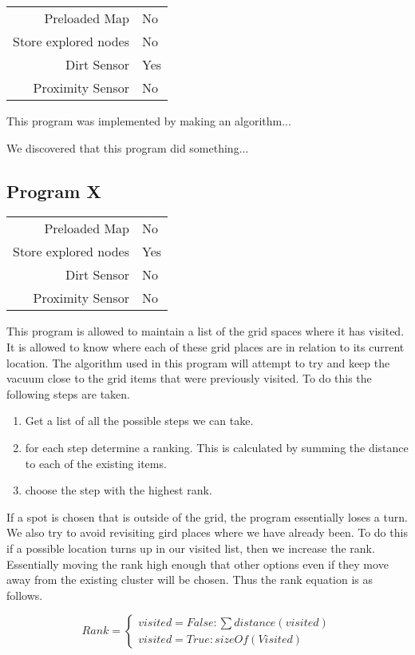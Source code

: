 \documentclass[letterpaper]{article}
\begin{document}
\begin{tabular}{ r | l }  
	Preloaded Map			& No \\
	Store explored nodes	& No \\
	Dirt Sensor				& Yes \\
	Proximity Sensor		& No \\
\end{tabular}

This program was implemented by making an algorithm...

We discovered that this program did something...


\subsection{Program X}

\begin{tabular}{ r | l }  
	Preloaded Map			& No \\
	Store explored nodes	& Yes \\
	Dirt Sensor				& No \\
	Proximity Sensor		& No \\
\end{tabular}

This program is allowed to maintain a list of the grid spaces where it has visited.  It is allowed to know where each of these grid places are in relation to its current location.
The algorithm used in this program will attempt to try and keep the vacuum close to the grid items that were previously visited.  To do this the following steps are taken.  
\begin{enumerate}  
\item Get a list of all the possible steps we can take.
\item for each step determine a ranking.  This is calculated by summing the distance to each of the existing items.
\item choose the step with the highest rank.
\end{enumerate}

If a spot is chosen that is outside of the grid, the program essentially loses a turn.  We also try to avoid revisiting gird places where we have already been.  To do this if a possible location turns up in our visited list, then we increase the rank.  Essentially moving the rank high enough that other options even if they move away from the existing cluster will be chosen.  Thus the rank equation is as follows.

\[
  Rank=
	\begin{cases}
		visited=False: \sum{distance(visited)}\\
		visited=True: sizeOf(Visited)
	\end{cases}
\]
\end{document}
